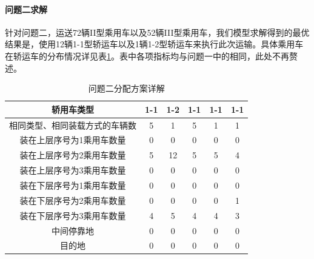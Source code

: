 \documentclass[UTF8]{ctexart}
\begin{document}
\paragraph{问题二求解}
针对问题二，运送72辆II型乘用车以及52辆III型乘用车，我们模型求解得到的最优结果是，使用12辆1-1型轿运车以及1辆1-2型轿运车来执行此次运输。具体乘用车在轿运车的分布情况详见表\ref{tab:answer2}。表中各项指标均与问题一中的相同，此处不再赘述。
\begin{table}[h!]
\centering
\caption{问题二分配方案详解}\label{tab:answer2}
\begin{tabular}{|c|c|c|c|c|c|}
\hline
轿用车类型 & 1-1 & 1-2 & 1-1 & 1-1 & 1-1\\ \hline 
相同类型、相同装载方式的车辆数 & 5 & 1 & 5 & 1 & 1\\ \hline 
装在上层序号为1乘用车数量 & 0 & 0 & 0 & 0 & 0\\ \hline 
装在上层序号为2乘用车数量 & 5 & 12 & 5 & 5 & 4\\ \hline 
装在上层序号为3乘用车数量 & 0 & 0 & 0 & 0 & 0\\ \hline 
装在下层序号为1乘用车数量 & 0 & 0 & 0 & 0 & 0\\ \hline 
装在下层序号为2乘用车数量 & 0 & 0 & 0 & 0 & 1\\ \hline 
装在下层序号为3乘用车数量 & 4 & 5 & 4 & 4 & 3\\ \hline 
中间停靠地 & 0 & 0 & 0 & 0 & 0\\ \hline 
目的地 & 0 & 0 & 0 & 0 & 0\\ \hline 
\end{tabular}
\end{table}
\end{document}
